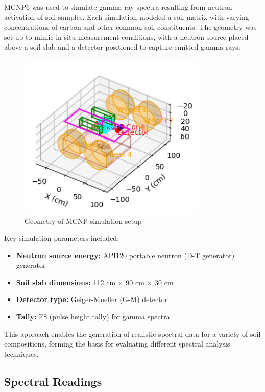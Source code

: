 \documentclass[review]{elsarticle}
\begin{document}
MCNP6 was used to simulate gamma-ray spectra resulting from neutron activation of soil samples. Each simulation modeled a soil matrix with varying concentrations of carbon and other common soil constituents. The geometry was set up to mimic in situ measurement conditions, with a neutron source placed above a soil slab and a detector positioned to capture emitted gamma rays.

\begin{figure}[H]
\centering
\includegraphics[width=0.8\textwidth]{Figures/DataGeneration/MCNPGeometry.png}
\caption{Geometry of MCNP simulation setup}
\label{fig:mcnp_geometry}
\end{figure}

Key simulation parameters included:

\begin{itemize}
\item \textbf{Neutron source energy:} API120 portable neutron (D-T generator) generator~\cite{kavetskiy2018}
\item \textbf{Soil slab dimensions:} 112 cm × 90 cm × 30 cm
\item \textbf{Detector type:} Geiger-Mueller (G-M) detector~\cite{yakubova2025}
\item \textbf{Tally:} F8 (pulse height tally) for gamma spectra
\end{itemize}

This approach enables the generation of realistic spectral data for a variety of soil compositions, forming the basis for evaluating different spectral analysis techniques.

\subsection{Spectral Readings}
\end{document}
